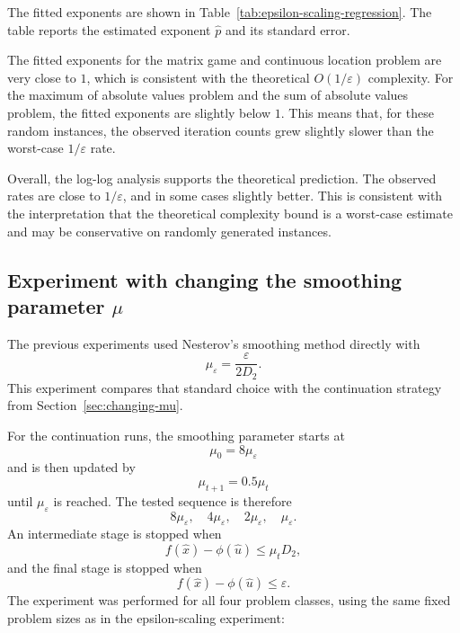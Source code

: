 \documentclass[11pt]{article}
\begin{document}
The fitted exponents are shown in Table~\ref{tab:epsilon-scaling-regression}.
The table reports the estimated exponent \(\hat p\) and its standard error.

\begin{table}[H]
    \centering
    
    \caption{Fitted exponents in the empirical model
    \(N(\varepsilon)\approx C\varepsilon^{-p}\).}
    \label{tab:epsilon-scaling-regression}
\end{table}

The fitted exponents for the matrix game and continuous location problem are
very close to \(1\), which is consistent with the theoretical
\(O(1/\varepsilon)\) complexity. For the maximum of absolute values problem and
the sum of absolute values problem, the fitted exponents are slightly below
\(1\). This means that, for these random instances, the observed iteration
counts grew slightly slower than the worst-case \(1/\varepsilon\) rate.

Overall, the log-log analysis supports the theoretical prediction. The observed
rates are close to \(1/\varepsilon\), and in some cases slightly better. This is
consistent with the interpretation that the theoretical complexity bound is a
worst-case estimate and may be conservative on randomly generated instances.



\subsection{Experiment with changing the smoothing parameter \texorpdfstring{\(\mu\)}{mu}}

The previous experiments used Nesterov's smoothing method directly with
\[
    \mu_\varepsilon=\frac{\varepsilon}{2D_2}.
\]
This experiment compares that standard choice with the continuation strategy
from Section~\ref{sec:changing-mu}.

For the continuation runs, the smoothing parameter starts at
\[
    \mu_0=8\mu_\varepsilon
\]
and is then updated by
\[
    \mu_{t+1}=0.5\mu_t
\]
until \(\mu_\varepsilon\) is reached. The tested sequence is therefore
\[
    8\mu_\varepsilon,
    \quad
    4\mu_\varepsilon,
    \quad
    2\mu_\varepsilon,
    \quad
    \mu_\varepsilon.
\]
An intermediate stage is stopped when
\[
    f(\hat x)-\phi(\hat u)\le \mu_tD_2,
\]
and the final stage is stopped when
\[
    f(\hat x)-\phi(\hat u)\le \varepsilon.
\]
The experiment was performed for all four problem classes, using the same fixed
problem sizes as in the epsilon-scaling experiment:
\end{document}

